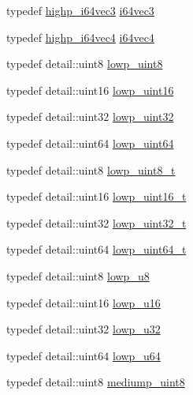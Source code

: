 \begin{DoxyCompactItemize}
typedef \hyperlink{group__gtc__type__precision_ga4030f8ad15da56f5e427aa457d39e888}{highp\+\_\+i64vec3} \hyperlink{group__gtc__type__precision_gab6eefcd7eb24e4142ed23dc1e87163a6}{i64vec3}
\item 
typedef \hyperlink{group__gtc__type__precision_ga0ea279cd954fbb71a1db62e897d4d7f5}{highp\+\_\+i64vec4} \hyperlink{group__gtc__type__precision_ga19846034cab6ee6e031884ea30def7fc}{i64vec4}
\item 
typedef detail\+::uint8 \hyperlink{group__gtc__type__precision_ga4d9dc08b7b248a386dfe9afd00fc6b1e}{lowp\+\_\+uint8}
\item 
typedef detail\+::uint16 \hyperlink{group__gtc__type__precision_ga9b8409887319f62f06e664f6ca121b9d}{lowp\+\_\+uint16}
\item 
typedef detail\+::uint32 \hyperlink{group__gtc__type__precision_gaf11e85af414720b4cd12bd57b3a81e68}{lowp\+\_\+uint32}
\item 
typedef detail\+::uint64 \hyperlink{group__gtc__type__precision_gacf666a9d9b309c4615c7a4f2ab0be289}{lowp\+\_\+uint64}
\item 
typedef detail\+::uint8 \hyperlink{group__gtc__type__precision_ga0910ef24195d1b8b26e34d73148c0c45}{lowp\+\_\+uint8\+\_\+t}
\item 
typedef detail\+::uint16 \hyperlink{group__gtc__type__precision_ga9a71176a4e5bc61951f9e9197d9c80e1}{lowp\+\_\+uint16\+\_\+t}
\item 
typedef detail\+::uint32 \hyperlink{group__gtc__type__precision_ga9f8cb602a358e1f48bda2682cf051f0c}{lowp\+\_\+uint32\+\_\+t}
\item 
typedef detail\+::uint64 \hyperlink{group__gtc__type__precision_gabf3069d4f188557a87b1d7f35eb0a270}{lowp\+\_\+uint64\+\_\+t}
\item 
typedef detail\+::uint8 \hyperlink{group__gtc__type__precision_gae63f942c49a30dbf266b2f13f3efe257}{lowp\+\_\+u8}
\item 
typedef detail\+::uint16 \hyperlink{group__gtc__type__precision_ga22c5364f27caa0a6eb0627cbc21e46be}{lowp\+\_\+u16}
\item 
typedef detail\+::uint32 \hyperlink{group__gtc__type__precision_gaba06fae1dd98ca50c017e68345df0365}{lowp\+\_\+u32}
\item 
typedef detail\+::uint64 \hyperlink{group__gtc__type__precision_ga61ed4c68a4cffb77cd63cc107119123a}{lowp\+\_\+u64}
\item 
typedef detail\+::uint8 \hyperlink{group__gtc__type__precision_gac4b849eaac0543a10f97f4bdda4850a8}{mediump\+\_\+uint8}
\item 

\end{DoxyCompactItemize}
